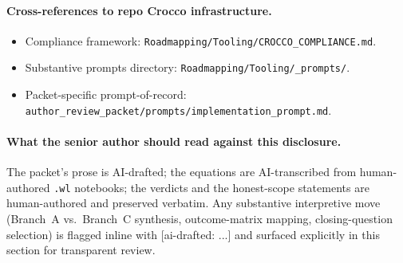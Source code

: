 \paragraph{Cross-references to repo Crocco infrastructure.}
\begin{itemize}[topsep=2pt,itemsep=0pt]
  \item Compliance framework:
        \texttt{Roadmapping/Tooling/CROCCO\_COMPLIANCE.md}.
  \item Substantive prompts directory:
        \texttt{Roadmapping/Tooling/\_prompts/}.
  \item Packet-specific prompt-of-record:
        \texttt{author\_review\_packet/prompts/implementation\_prompt.md}.
\end{itemize}

\paragraph{What the senior author should read against this disclosure.}
The packet's prose is AI-drafted; the equations are AI-transcribed from
human-authored \texttt{.wl} notebooks; the verdicts and the
honest-scope statements are human-authored and preserved verbatim. Any
substantive interpretive move (Branch~A vs.~Branch~C synthesis, outcome-matrix
mapping, closing-question selection) is flagged inline with
\textcolor{blue!60!black}{[ai-drafted: ...]} and surfaced explicitly in this
section for transparent review.

